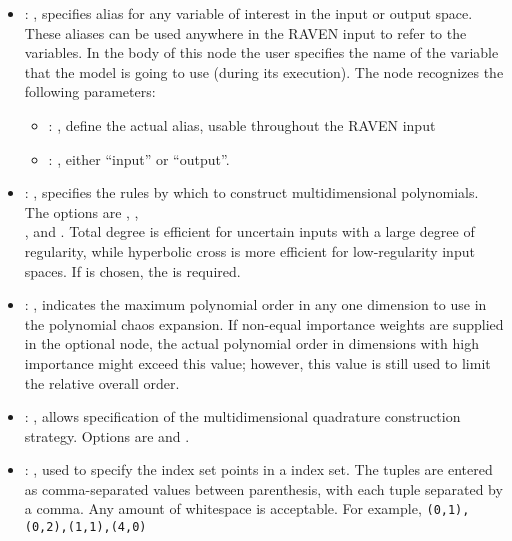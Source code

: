 \begin{itemize}
    \item {}: , 
      specifies alias for         any variable of interest in the input or output space. These
      aliases can be used anywhere in the RAVEN input to         refer to the variables. In the body
      of this node the user specifies the name of the variable that the model is going to use
      (during its execution).
      The  node recognizes the following parameters:
        \begin{itemize}
          \item {}: , 
            define the actual alias, usable throughout the RAVEN input
          \item {}: , 
            either ``input'' or ``output''.
      \end{itemize}

    \item {}: , 
      specifies the rules by which to construct multidimensional polynomials.  The options are
      , ,\\
      , and .
      Total degree is efficient for                                                  uncertain
      inputs with a large degree of regularity, while hyperbolic cross is more efficient
      for low-regularity input spaces.                                                  If
       is chosen, the  is required.

    \item {}: , 
      indicates the maximum polynomial order in any one dimension to use in the
      polynomial chaos expansion. \nb If non-equal importance weights are supplied in the optional
       node, the actual polynomial order in dimensions with high
      importance might exceed this value; however, this value is still used to limit the
      relative overall order.

    \item {}: , 
      allows specification of the multidimensional
      quadrature construction strategy.  Options are  and .

    \item {}: , 
      used to specify the index set points in a  index set.  The tuples are
      entered as comma-separated values between parenthesis, with each tuple separated by a comma.
      Any amount of whitespace is acceptable.  For example,
      \verb'(0,1),(0,2),(1,1),(4,0)'


\end{itemize}
